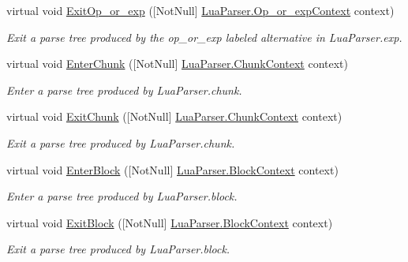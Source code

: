 \begin{DoxyCompactItemize}
virtual void \mbox{\hyperlink{classzlua_1_1_lua_base_listener_a2f3d1101cea30188e37757f54eeb45ad}{Exit\+Op\+\_\+or\+\_\+exp}} (\mbox{[}Not\+Null\mbox{]} \mbox{\hyperlink{classzlua_1_1_lua_parser_1_1_op__or__exp_context}{Lua\+Parser.\+Op\+\_\+or\+\_\+exp\+Context}} context)
\begin{DoxyCompactList}\small\item\em Exit a parse tree produced by the {\ttfamily op\+\_\+or\+\_\+exp} labeled alternative in Lua\+Parser.\+exp. \end{DoxyCompactList}\item 
virtual void \mbox{\hyperlink{classzlua_1_1_lua_base_listener_a441cbddff1cc031c9eec17003ddff72f}{Enter\+Chunk}} (\mbox{[}Not\+Null\mbox{]} \mbox{\hyperlink{classzlua_1_1_lua_parser_1_1_chunk_context}{Lua\+Parser.\+Chunk\+Context}} context)
\begin{DoxyCompactList}\small\item\em Enter a parse tree produced by Lua\+Parser.\+chunk. \end{DoxyCompactList}\item 
virtual void \mbox{\hyperlink{classzlua_1_1_lua_base_listener_aef4ea05d4f1cf0a5c223da23a2b8a312}{Exit\+Chunk}} (\mbox{[}Not\+Null\mbox{]} \mbox{\hyperlink{classzlua_1_1_lua_parser_1_1_chunk_context}{Lua\+Parser.\+Chunk\+Context}} context)
\begin{DoxyCompactList}\small\item\em Exit a parse tree produced by Lua\+Parser.\+chunk. \end{DoxyCompactList}\item 
virtual void \mbox{\hyperlink{classzlua_1_1_lua_base_listener_af7d5b6a200e1b7efe6886c7fdad9a0f3}{Enter\+Block}} (\mbox{[}Not\+Null\mbox{]} \mbox{\hyperlink{classzlua_1_1_lua_parser_1_1_block_context}{Lua\+Parser.\+Block\+Context}} context)
\begin{DoxyCompactList}\small\item\em Enter a parse tree produced by Lua\+Parser.\+block. \end{DoxyCompactList}\item 
virtual void \mbox{\hyperlink{classzlua_1_1_lua_base_listener_a8d6e54dc1618ec3c8fdcc8ccea015a4f}{Exit\+Block}} (\mbox{[}Not\+Null\mbox{]} \mbox{\hyperlink{classzlua_1_1_lua_parser_1_1_block_context}{Lua\+Parser.\+Block\+Context}} context)
\begin{DoxyCompactList}\small\item\em Exit a parse tree produced by Lua\+Parser.\+block. \end{DoxyCompactList}\item 

\end{DoxyCompactItemize}
